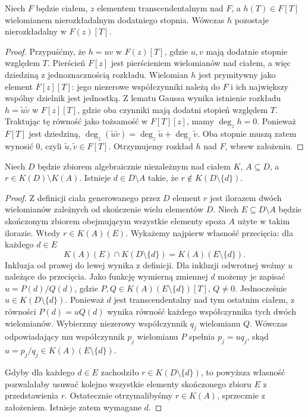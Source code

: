 \begin{lemat}
\label{aa:lem:transcendence-irreducible-pure}
Niech $F$ będzie ciałem, $z$ elementem transcendentalnym nad $F$,
a $h(T)\in F[T]$ wielomianem nierozkładalnym dodatniego stopnia.
Wówczas $h$ pozostaje nierozkładalny w $F(z)[T]$.
\end{lemat}
\begin{proof}
Przypuśćmy, że $h=uv$ w $F(z)[T]$,
gdzie $u,v$ mają dodatnie stopnie względem $T$.
Pierścień $F[z]$ jest pierścieniem wielomianów nad ciałem,
a więc dziedziną z jednoznacznością rozkładu.
Wielomian $h$ jest prymitywny jako element $F[z][T]$:
jego niezerowe współczynniki należą do $F$ i ich
największy wspólny dzielnik jest jednostką.
Z lematu Gaussa wynika istnienie rozkładu
$h=\widetilde u\widetilde v$ w $F[z][T]$,
gdzie oba czynniki mają dodatni stopień względem $T$.
Traktując tę równość jako tożsamość w $F[T][z]$, mamy
$\deg_z h=0$. Ponieważ $F[T]$ jest dziedziną,
$\deg_z(\widetilde u\widetilde v)=
\deg_z\widetilde u+\deg_z\widetilde v$.
Oba stopnie muszą zatem wynosić $0$, czyli
$\widetilde u,\widetilde v\in F[T]$.
Otrzymujemy rozkład $h$ nad $F$, wbrew założeniu.
\end{proof}

\begin{lemat}
\label{aa:lem:transcendence-essential-variable}
Niech $D$ będzie zbiorem algebraicznie niezależnym nad ciałem $K$,
$A\subseteq D$, a $r\in K(D)\setminus K(A)$.
Istnieje $d\in D\setminus A$ takie, że
$r\notin K(D\setminus\{d\})$.
\end{lemat}
\begin{proof}
Z definicji ciała generowanego przez $D$ element $r$ jest
ilorazem dwóch wielomianów zależnych od skończenie wielu
elementów $D$. Niech $E\subseteq D\setminus A$ będzie
skończonym zbiorem obejmującym wszystkie elementy spoza $A$
użyte w takim ilorazie. Wtedy $r\in K(A)(E)$.
Wykażemy najpierw własność przecięcia: dla każdego $d\in E$
\[
 K(A)(E)\cap K(D\setminus\{d\})
   =K(A)(E\setminus\{d\}).
\]
Inkluzja od prawej do lewej wynika z definicji.
Dla inkluzji odwrotnej weźmy $u$ należące do przecięcia.
Jako funkcję wymierną zmiennej $d$ możemy je zapisać
$u=P(d)/Q(d)$, gdzie
$P,Q\in K(A)(E\setminus\{d\})[T]$, $Q\ne0$.
Jednocześnie $u\in K(D\setminus\{d\})$.
Ponieważ $d$ jest transcendentalny nad tym ostatnim ciałem,
z równości $P(d)=uQ(d)$ wynika równość każdego
współczynnika tych dwóch wielomianów.
Wybierzmy niezerowy współczynnik $q_j$ wielomianu $Q$.
Wówczas odpowiadający mu współczynnik $p_j$ wielomianu $P$
spełnia $p_j=uq_j$, skąd
$u=p_j/q_j\in K(A)(E\setminus\{d\})$.

Gdyby dla każdego $d\in E$ zachodziło
$r\in K(D\setminus\{d\})$, to powyższa własność pozwalałaby
usuwać kolejno wszystkie elementy skończonego zbioru $E$
z przedstawienia $r$.
Ostatecznie otrzymalibyśmy $r\in K(A)$,
sprzecznie z założeniem. Istnieje zatem wymagane $d$.
\end{proof}

